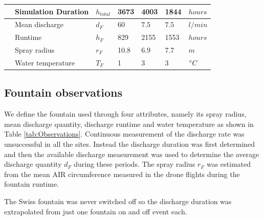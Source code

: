 \documentclass[utf8]{frontiersSCNS}
\begin{document}
\begin{table}
\begin{tabular}{@{}|lllllll|@{}}
		\multicolumn{1}{|l|}{} & Simulation Duration         & $h_{total} $    & 3673          & 4003
		                       & 1844                        & $hours$                                                                     \\\bottomrule
		\multicolumn{1}{|l|}{\multirow{4}{*}{\rotatebox[origin=c]{90}{Fountain}}}
		                       & Mean discharge              & $d_F     $      & $60$          & $7.5$        &
		$7.5$                  & $l/min$                                                                                                   \\
		\multicolumn{1}{|l|}{} & Runtime                     & $h_F $          & 829           & 2155
		                       & 1553                        & $hours$                                                                     \\
		\multicolumn{1}{|l|}{} & Spray radius                & $r_{F}$         & 10.8          & 6.9
		                       & 7.7                         & $m$                                                                         \\
		\multicolumn{1}{|l|}{} & Water temperature           & $T_{F}$         & 1             & 3
		                       & 3                           & $\degree C$                                                                 \\\midrule
	\end{tabular}
\end{table}


\subsection{Fountain observations}

We define the fountain used through four attributes, namely its spray radius, mean discharge quantity, discharge
runtime and water temperature as shown in Table \ref{tab:Observations}. Continuous measurement of the discharge
rate was unsuccessful in all the sites. Instead the discharge duration was first determined and then the
available discharge measurement was used to determine the average discharge quantity $d_F$ during these periods.
The spray radius $r_F$ was estimated from the mean AIR circumference measured in the drone flights during the
fountain runtime.

The Swiss fountain was never switched off so the discharge duration was extrapolated from just one fountain on
and off event each.
\end{document}
